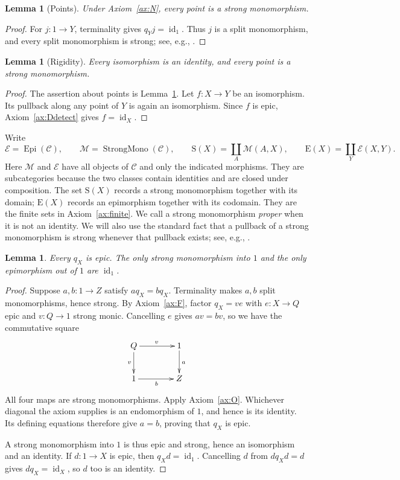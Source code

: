 \documentclass[11pt,a4paper]{article}
\theoremstyle{plain}
\newtheorem{lemma}[theorem]{Lemma}
\theoremstyle{definition}
\theoremstyle{remark}
\newcommand{\C}{\mathcal C}
\newcommand{\Ocat}{\mathcal M}
\newcommand{\Dcat}{\mathcal E}
\newcommand{\one}{1}
\newcommand{\id}{\operatorname{id}}
\newcommand{\Occ}{\mathrm{S}}
\newcommand{\Out}{\mathrm{E}}
\begin{document}
\begin{lemma}[Points]\label{lem:points-strong}
Under Axiom~\ref{ax:N}, every point is a strong monomorphism.
\end{lemma}
\begin{proof}
For $j:\one\to Y$, terminality gives $q_Yj=\id_{\one}$.
Thus $j$ is a split monomorphism, and every split monomorphism
is strong; see, e.g., \cite[p.~292]{CassidyHebertKelly}.
\end{proof}


\begin{lemma}[Rigidity]\label{lem:rigidity}
Every isomorphism is an identity, and every point is a strong monomorphism.
\end{lemma}
\begin{proof}
The assertion about points is Lemma~\ref{lem:points-strong}.
Let $f:X\to Y$ be an isomorphism. Its pullback along any point
of $Y$ is again an isomorphism. Since $f$ is epic,
Axiom~\ref{ax:Ddetect} gives $f=\id_X$.
\end{proof}

Write
\[
\Dcat=\operatorname{Epi}(\C),\qquad
\Ocat=\operatorname{StrongMono}(\C),\qquad
\Occ(X)=\coprod_A\Ocat(A,X),\qquad
\Out(X)=\coprod_Y\Dcat(X,Y).
\]
Here $\Ocat$ and $\Dcat$ have all objects of $\C$ and only the
indicated morphisms. They are subcategories because the two classes
contain identities and are closed under composition. The set
$\Occ(X)$ records a strong monomorphism together with its domain;
$\Out(X)$ records an epimorphism together with its codomain.
They are the finite sets in Axiom~\ref{ax:finite}. We call a
strong monomorphism \emph{proper} when it is not an identity.
We will also use the standard fact that a pullback of a strong
monomorphism is strong whenever that pullback exists; see, e.g.,
\cite[pp.~290 and 292]{CassidyHebertKelly}.

\begin{lemma}\label{lem:empty}
Every $q_X$ is epic. The only strong monomorphism into $\one$ and the only
epimorphism out of $\one$ are $\id_\one$.
\end{lemma}
\begin{proof}
Suppose $a,b:\one\to Z$ satisfy $a q_X=b q_X$.
Terminality makes $a,b$ split monomorphisms, hence strong.
By Axiom~\ref{ax:F}, factor $q_X=ve$ with $e:X\to Q$ epic and
$v:Q\to\one$ strong monic. Cancelling $e$ gives $av=bv$, so we have
the commutative square
\[
 \xymatrix@C=4em@R=2.5em{
Q\ar[r]^v\ar[d]_v&\one\ar[d]^a\\
 \one\ar[r]_b&Z
 }
\]
All four maps are strong monomorphisms. Apply Axiom~\ref{ax:O}.
Whichever diagonal the axiom supplies is an endomorphism of $\one$,
and hence is its identity. Its defining equations therefore give
$a=b$, proving that $q_X$ is epic.

A strong monomorphism into $\one$ is thus epic and strong, hence an
isomorphism and an identity. If $d:\one\to X$ is epic,
then $q_Xd=\id_\one$. Cancelling $d$ from $dq_Xd=d$
gives $dq_X=\id_X$, so $d$ too is an identity.
\end{proof}
\end{document}
